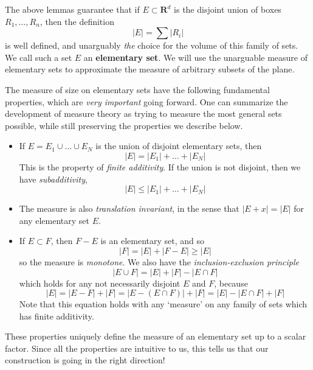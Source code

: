 %


%

The above lemmas guarantee that if $E \subset \mathbf{R}^d$ is the disjoint union of boxes $R_1, \dots, R_n$, then the definition
%
\[ |E| = \sum |R_i| \]
%
is well defined, and unarguably {\it the} choice for the volume of this family of sets. We call such a set $E$ an {\bf elementary set}. We will use the unarguable measure of elementary sets to approximate the measure of arbitrary subsets of the plane.

The measure of size on elementary sets have the following fundamental properties, which are {\it very important} going forward. One can summarize the development of measure theory as trying to measure the most general sets possible, while still preserving the properties we describe below.
%
\begin{itemize}
    \item If $E = E_1 \cup \dots \cup E_N$ is the union of disjoint elementary sets, then
  \[ |E| = |E_1| + \dots + |E_N| \]
  This is the property of {\it finite additivity}. If the union is not disjoint, then we have {\it subadditivity},
  \[ |E| \leq |E_1| + \dots + |E_N| \]

  \item The measure is also {\it translation invariant}, in the sense that $|E + x| = |E|$ for any elementary set $E$.

  \item If $E \subset F$, then $F - E$ is an elementary set, and so
  \[ |F| = |E| + |F - E| \geq |E| \]
  so the measure is {\it monotone}. We also have the {\it inclusion-exclusion principle}
  \[ |E \cup F| = |E| + |F| - |E \cap F| \]
  which holds for any not necessarily disjoint $E$ and $F$, because
  \[ |E| = |E - F| + |F| = |E - (E \cap F)| + |F| = |E| - |E \cap F| + |F| \]
  Note that this equation holds with any `measure' on any family of sets which has finite additivity.
\end{itemize}
%
These properties uniquely define the measure of an elementary set up to a scalar factor. Since all the properties are intuitive to us, this tells us that our construction is going in the right direction!

